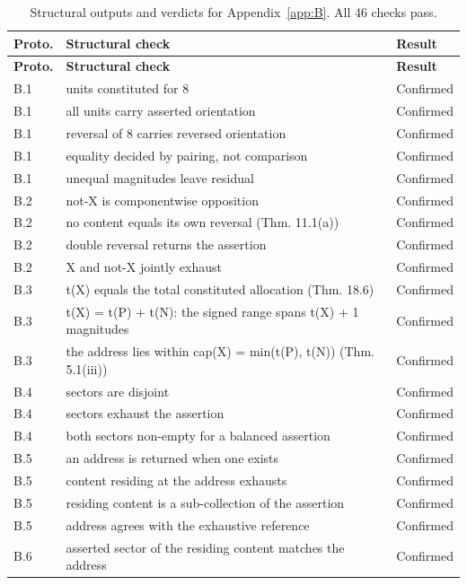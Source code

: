 \documentclass[pdflatex,sn-mathphys-num]{sn-jnl}
\theoremstyle{thmstyleone}%
\theoremstyle{thmstyletwo}%
\theoremstyle{thmstylethree}%
\begin{document}
\begin{appendices}
\begingroup\small\renewcommand{\arraystretch}{1.25}
\begin{longtable}{@{} p{} p{} p{} @{}}
\caption{Structural outputs and verdicts for Appendix~\ref{app:B}. All 46 checks pass.}\label{tab:appB_results}\\
\toprule
\textbf{Proto.} & \textbf{Structural check} & \textbf{Result} \\
\midrule
\endfirsthead
\toprule
\textbf{Proto.} & \textbf{Structural check} & \textbf{Result} \\
\midrule
\endhead
\bottomrule
\endfoot
B.1 & units constituted for 8 & Confirmed \\
B.1 & all units carry asserted orientation & Confirmed \\
B.1 & reversal of 8 carries reversed orientation & Confirmed \\
B.1 & equality decided by pairing, not comparison & Confirmed \\
B.1 & unequal magnitudes leave residual & Confirmed \\
B.2 & not-X is componentwise opposition & Confirmed \\
B.2 & no content equals its own reversal (Thm. 11.1(a)) & Confirmed \\
B.2 & double reversal returns the assertion & Confirmed \\
B.2 & X and not-X jointly exhaust & Confirmed \\
B.3 & t(X) equals the total constituted allocation (Thm. 18.6) & Confirmed \\
B.3 & t(X) = t(P) + t(N): the signed range spans t(X) + 1 magnitudes & Confirmed \\
B.3 & the address lies within cap(X) = min(t(P), t(N)) (Thm. 5.1(iii)) & Confirmed \\
B.4 & sectors are disjoint & Confirmed \\
B.4 & sectors exhaust the assertion & Confirmed \\
B.4 & both sectors non-empty for a balanced assertion & Confirmed \\
B.5 & an address is returned when one exists & Confirmed \\
B.5 & content residing at the address exhausts & Confirmed \\
B.5 & residing content is a sub-collection of the assertion & Confirmed \\
B.5 & address agrees with the exhaustive reference & Confirmed \\
B.6 & asserted sector of the residing content matches the address & Confirmed \\

\end{longtable}
\end{appendices}
\end{document}
